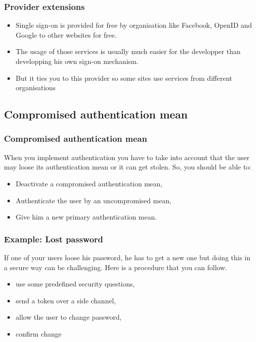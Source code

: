 \begin{frame}
\frametitle{Provider extensions}
\begin{itemize}
\item Single sign-on is provided for free by organisation like Facebook, OpenID and
Google to other websites for free.
\item The usage of those services is usually much easier for the
  developper than developping his own sign-on mechanism.
\item But it ties you to this provider so some sites use services from
  different organisations
\end{itemize}

\end{frame}

\subsection{Compromised authentication mean}

\begin{frame}
\frametitle{Compromised authentication mean}
 When you implement authentication you have to take into account that
 the user may loose its authentication mean or it can get stolen. So,
 you should be able to:

\begin{itemize}
\item Deactivate a compromised authentication mean,
\item Authenticate the user by an uncompromised mean,
\item Give him a new primary authentication mean.
\end{itemize}

\end{frame}


\begin{frame}
\frametitle{Example: Lost password}
 If one of your users loose his password, he has to get a new one but
 doing this in a secure way can be challenging. Here is a procedure
 that you can follow.

\begin{itemize}
\item use some predefined security questions,
\item send a token over a side channel,
\item allow the user to change password,
\item confirm change
\end{itemize}

\end{frame}
